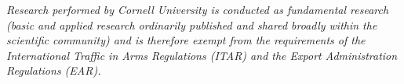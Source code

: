 \documentclass[12pt,
        usenames, %
        dvipsnames %
    ]{article}
\begin{document}
\emph{Research performed by Cornell University is conducted as fundamental
research (basic and applied research ordinarily published and shared broadly
within the scientific community) and is therefore exempt from the requirements
of the International Traffic in Arms Regulations (ITAR) and the Export
Administration Regulations (EAR).}

\clearpage

\printbibliography
\end{document}

